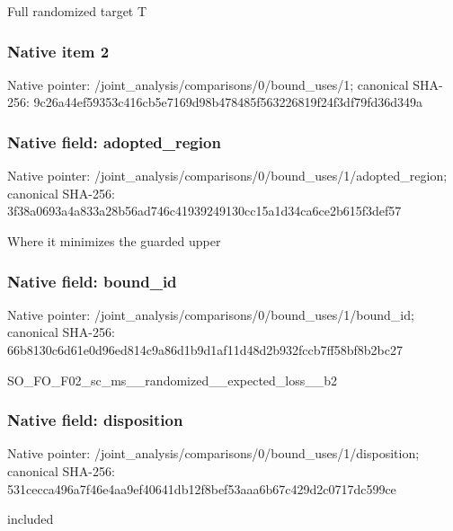 \documentclass[10pt,a4paper]{article}
\begin{document}
\begingroup\raggedright\sloppy Full randomized target T\par\endgroup

\subsubsection{Native item 2}
Native pointer: /joint\_\allowbreak{}analysis/comparisons/0/bound\_\allowbreak{}uses/1; canonical SHA-256: 9c26a44ef59353c416cb5e7169d98b478485f563226819f24f3df79fd36d349a

\subsubsection{Native field: adopted\_\allowbreak{}region}
Native pointer: /joint\_\allowbreak{}analysis/comparisons/0/bound\_\allowbreak{}uses/1/adopted\_\allowbreak{}region; canonical SHA-256: 3f38a0693a4a833a28b56ad746c41939249130cc15a1d34ca6ce2b615f3def57

\begingroup\raggedright\sloppy Where it minimizes the guarded upper\par\endgroup

\subsubsection{Native field: bound\_\allowbreak{}id}
Native pointer: /joint\_\allowbreak{}analysis/comparisons/0/bound\_\allowbreak{}uses/1/bound\_\allowbreak{}id; canonical SHA-256: 66b8130c6d61e0d96ed814c9a86d1b9d1af11d48d2b932fccb7ff58bf8b2bc27

\begingroup\raggedright\sloppy SO\_\allowbreak{}FO\_\allowbreak{}F02\_\allowbreak{}sc\_\allowbreak{}ms\_\allowbreak{}\_\allowbreak{}randomized\_\allowbreak{}\_\allowbreak{}expected\_\allowbreak{}loss\_\allowbreak{}\_\allowbreak{}b2\par\endgroup

\subsubsection{Native field: disposition}
Native pointer: /joint\_\allowbreak{}analysis/comparisons/0/bound\_\allowbreak{}uses/1/disposition; canonical SHA-256: 531cecca496a7f46e4aa9ef40641db12f8bef53aaa6b67c429d2c0717dc599ce

\begingroup\raggedright\sloppy included\par\endgroup
\end{document}
